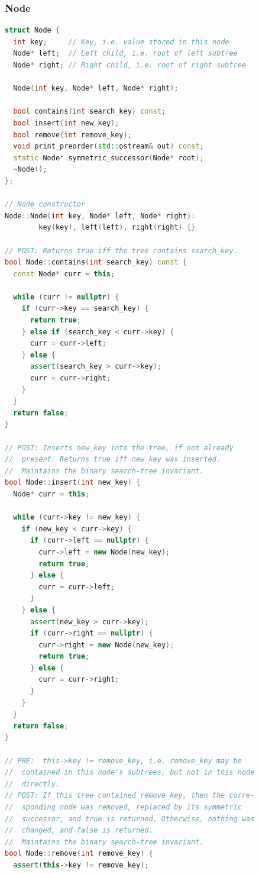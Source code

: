 \subsubsection{Node}\smallskip
\begin{lstlisting}[language=C++]
struct Node {
  int key;     // Key, i.e. value stored in this node
  Node* left;  // Left child, i.e. root of left subtree
  Node* right; // Right child, i.e. root of right subtree
  
  Node(int key, Node* left, Node* right);
  
  bool contains(int search_key) const;
  bool insert(int new_key);
  bool remove(int remove_key);
  void print_preorder(std::ostream& out) const;
  static Node* symmetric_successor(Node* root);
  ~Node();
};

// Node constructor
Node::Node(int key, Node* left, Node* right): 
        key(key), left(left), right(right) {}

// POST: Returns true iff the tree contains search_key.
bool Node::contains(int search_key) const {
  const Node* curr = this;
  
  while (curr != nullptr) {
    if (curr->key == search_key) {
      return true;
    } else if (search_key < curr->key) {
      curr = curr->left;
    } else {
      assert(search_key > curr->key);
      curr = curr->right;
    }
  }
  return false;
}

// POST: Inserts new_key into the tree, if not already 
//  present. Returns true iff new_key was inserted.
//  Maintains the binary search-tree invariant.
bool Node::insert(int new_key) {
  Node* curr = this;
  
  while (curr->key != new_key) {
    if (new_key < curr->key) {
      if (curr->left == nullptr) {
        curr->left = new Node(new_key);
        return true;
      } else {
        curr = curr->left;
      }
    } else {
      assert(new_key > curr->key);
      if (curr->right == nullptr) {
        curr->right = new Node(new_key);
        return true;
      } else {
        curr = curr->right;
      }
    }
  }
  return false;
}

// PRE:  this->key != remove_key, i.e. remove_key may be 
//  contained in this node's subtrees, but not in this node 
//  directly.
// POST: If this tree contained remove_key, then the corre-
//  sponding node was removed, replaced by its symmetric 
//  successor, and true is returned. Otherwise, nothing was 
//  changed, and false is returned. 
//  Maintains the binary search-tree invariant.
bool Node::remove(int remove_key) {
  assert(this->key != remove_key);
  

\end{lstlisting}
